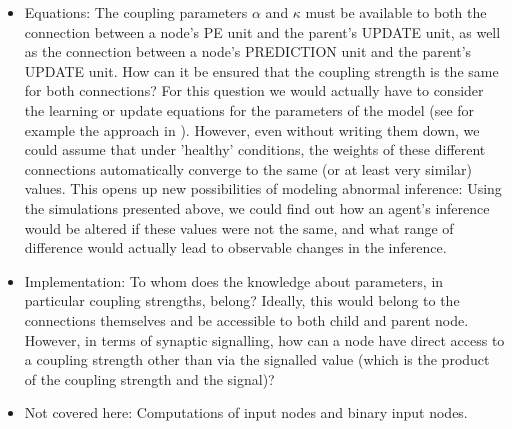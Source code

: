 \begin{itemize}
	\item Equations: The coupling parameters $\alpha$ and $\kappa$ must be available to both the connection between a node's \textsf{PE unit} and the parent's \textsf{UPDATE unit}, as well as the connection between a node's \textsf{PREDICTION unit} and the parent's \textsf{UPDATE unit}. How can it be ensured that the coupling strength is the same for both connections? For this question we would actually have to consider the learning or update equations for the parameters of the model (see for example the approach in \cite{Bogacz2017}). However, even without writing them down, we could assume that under 'healthy' conditions, the weights of these different connections automatically converge to the same (or at least very similar) values. This opens up new possibilities of modeling abnormal inference: Using the simulations presented above, we could find out how an agent's inference would be altered if these values were not the same, and what range of difference would actually lead to observable changes in the inference. 

	\item Implementation: To whom does the knowledge about parameters, in particular coupling strengths, belong? Ideally, this would belong to the connections themselves and be accessible to both child and parent node. However, in terms of synaptic signalling, how can a node have direct access to a coupling strength other than via the signalled value (which is the product of the coupling strength and the signal)?

	\item Not covered here: Computations of input nodes and binary input nodes.
\end{itemize}